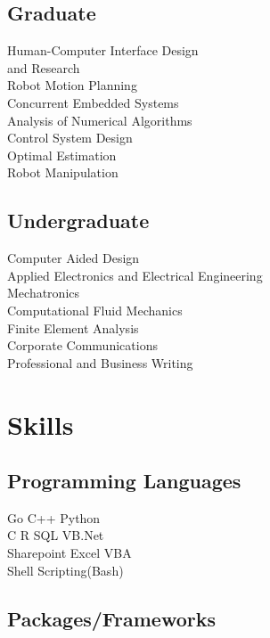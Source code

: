 \documentclass[]{deedy-resume-openfont}
\begin{document}
\begin{minipage}[t]{0.33\textwidth}
\subsection{Graduate}
Human-Computer Interface Design \\ and Research\\
Robot Motion Planning\\
Concurrent Embedded Systems\\
Analysis of Numerical Algorithms\\
Control System Design\\
Optimal Estimation\\
Robot Manipulation\\

\sectionsep{}

\subsection{Undergraduate}
Computer Aided Design \\
Applied Electronics and Electrical Engineering\\
Mechatronics \\
Computational Fluid Mechanics\\
Finite Element Analysis\\
Corporate Communications\\
Professional and Business Writing\\
\sectionsep


\section{Skills}

\subsection{Programming Languages}

Go \textbullet{} C++ \textbullet{} Python \\C \textbullet{}
R \textbullet{} SQL \textbullet{} VB.Net \\
Sharepoint \textbullet{} Excel VBA\\
Shell Scripting(Bash)

\sectionsep

\subsection{Packages/Frameworks}


\end{minipage}
\end{document}
